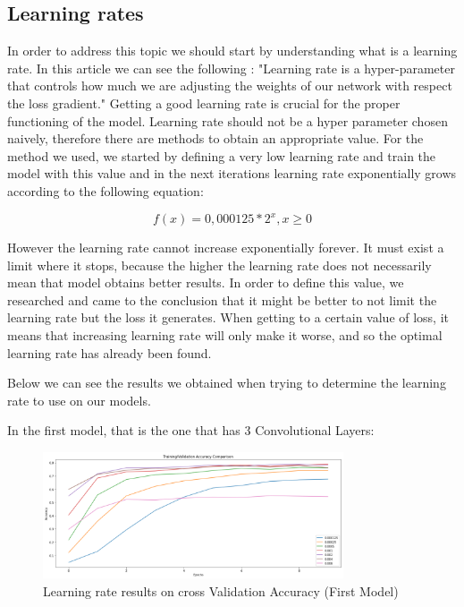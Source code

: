 \documentclass[conference]{IEEEtran}
\begin{document}
\subsection{Learning rates}
In order to address this topic we should start by understanding what is a learning rate. In this article \cite{D} we can see the following :
"Learning rate is a hyper-parameter that controls how much we are adjusting the weights of our network with respect the loss gradient."
Getting a good learning rate is crucial for the proper functioning of the model. Learning rate should not be a hyper parameter chosen naively, therefore there are methods to obtain an appropriate value. For the method we used, we started by defining a very low learning rate and train the model with this value and in the next iterations learning rate exponentially grows according to the following equation:
\linebreak

\begin{equation*}
  f(x) = 0,000125 * 2^x , x\geqslant0
\end{equation*}

However the learning rate cannot increase exponentially forever. It must exist a limit where it stops, because the higher the learning rate does not necessarily mean that model obtains better results. In order to define this value, we researched and came to the conclusion that it might be better to not limit the learning rate but the loss it generates. When getting to a certain value of loss, it means that increasing learning rate will only make it worse, and so the optimal learning rate has already been found.

Below we can see the results we obtained when trying to determine the learning rate to use on our models.

In the first model, that is the one that has 3 Convolutional Layers:
\begin{figure}[H]
    \centering
    \includegraphics[width=3.5in]{pictures/model1_learning_rate_accuracy.png}
    \caption{Learning rate results on cross Validation Accuracy (First Model)}\label{fig:example4}
\end{figure}
\end{document}
